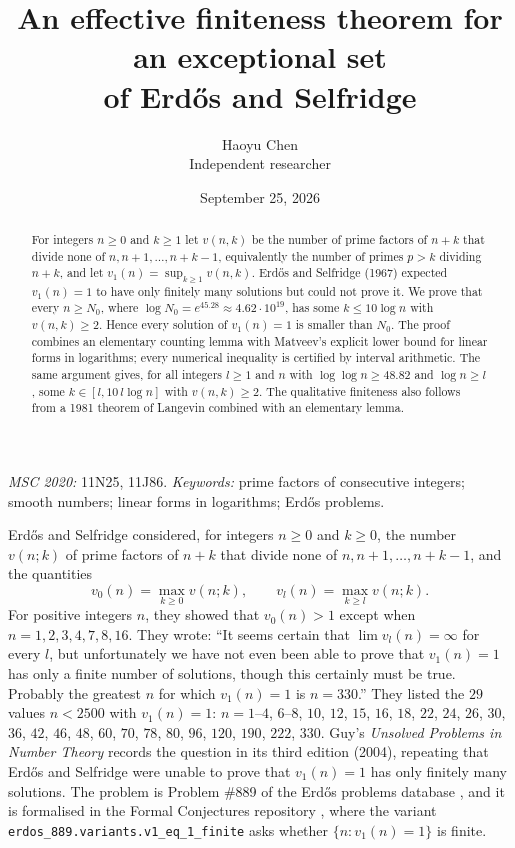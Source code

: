 \documentclass[10pt]{article}
\title{An effective finiteness theorem for an exceptional set\\ of Erd\H{o}s and Selfridge}
\author{Haoyu Chen\\ Independent researcher}
\date{September 25, 2026}
\makeatletter
\numberwithin{equation}{section}
\theoremstyle{definition}
\theoremstyle{plain}
\renewcommand\section{\@startsection{section}{1}{\z@}{-2.6ex \@plus -.8ex \@minus -.2ex}{1.3ex \@plus .2ex}{\normalfont\large\bfseries}}
\makeatother
\begin{document}
\maketitle

\begin{abstract}
For integers $n\ge 0$ and $k\ge 1$ let $v(n,k)$ be the number of prime factors of $n+k$ that divide none
of $n,n+1,\dots,n+k-1$, equivalently the number of primes $p>k$ dividing $n+k$, and let
$v_1(n)=\sup_{k\ge 1}v(n,k)$. Erd\H{o}s and Selfridge (1967) expected $v_1(n)=1$ to have only finitely many
solutions but could not prove it. We prove that every $n\ge N_0$, where
$\log N_0=e^{45.28}\approx 4.62\cdot 10^{19}$, has some $k\le 10\log n$ with $v(n,k)\ge 2$. Hence every
solution of $v_1(n)=1$ is smaller than $N_0$. The proof combines an elementary counting lemma with
Matveev's explicit lower bound for linear forms in logarithms; every numerical inequality is certified by
interval arithmetic. The same argument gives, for all integers $l\ge1$ and $n$ with $\log\log n\ge 48.82$ and
$\log n\ge l$, some $k\in[l,10\,l\log n]$ with $v(n,k)\ge 2$. The qualitative finiteness also follows from
a 1981 theorem of Langevin combined with an elementary lemma.
\end{abstract}

\noindent\textit{MSC 2020:} 11N25, 11J86.\quad
\textit{Keywords:} prime factors of consecutive integers; smooth numbers; linear forms in logarithms;
Erd\H{o}s problems.

\section{Introduction}

Erd\H{o}s and Selfridge \cite{ErSe67} considered, for integers $n\ge 0$ and $k\ge 0$, the number $v(n;k)$
of prime factors of $n+k$ that divide none of $n,n+1,\dots,n+k-1$, and the quantities
\[
v_0(n)=\max_{k\ge 0}v(n;k),\qquad v_l(n)=\max_{k\ge l}v(n;k).
\]
For positive integers $n$, they showed that $v_0(n)>1$ except when $n=1,2,3,4,7,8,16$. They wrote: ``It seems certain that
$\lim v_l(n)=\infty$ for every $l$, but unfortunately we have not even been able to prove that $v_1(n)=1$ has
only a finite number of solutions, though this certainly must be true. Probably the greatest $n$ for which
$v_1(n)=1$ is $n=330$.'' They listed the $29$ values $n<2500$ with $v_1(n)=1$:
$n=1$--$4$, $6$--$8$, $10$, $12$, $15$, $16$, $18$, $22$, $24$, $26$, $30$, $36$, $42$, $46$, $48$, $60$, $70$,
$78$, $80$, $96$, $120$, $190$, $222$, $330$.
Guy's \emph{Unsolved Problems in Number Theory} \cite[B27]{Gu04} records the question in its third edition
(2004), repeating that Erd\H{o}s and Selfridge were unable to prove that $v_1(n)=1$ has only finitely many
solutions. The problem is Problem \#889 of the Erd\H{o}s problems database \cite{EP889}, and it is formalised
in the Formal Conjectures repository \cite{FC}, where the variant \texttt{erdos\_889.variants.v1\_eq\_1\_finite}
asks whether $\{n: v_1(n)=1\}$ is finite.
\end{document}
